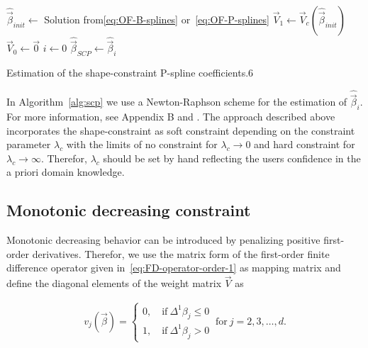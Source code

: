 \documentclass[10pt,a4paper]{report}
\begin{document}
\begin{algorithm}[H]
	\SetAlgoLined
	$\hat{\vec{\beta}}_{init} \gets$ Solution from\ref{eq:OF-B-splines} or~\ref{eq:OF-P-splines}\;
	$\vec{V}_1 \gets \vec{V}_c(\hat{\vec{\beta}}_{init})$\;
	$\vec{V}_0 \gets \vec{0}$\;
	$ i \gets 0$\;
	$\hat{\vec{\beta}}_{SCP} \gets \hat{\vec{\beta}}_{i}$
	\caption{Estimation of the shape-constraint P-spline coefficients.6}
	\label{alg:scp}
\end{algorithm}
%
In Algorithm~\ref{alg:scp}  we use a Newton-Raphson scheme for the estimation of $\hat{\vec{\beta}}_i$. For more information, see Appendix B and \cite{bollaerts2006simple}. The approach described above incorporates the shape-constraint as soft constraint depending on the constraint parameter $\lambda_c$ with the limits of no constraint for $\lambda_c \rightarrow 0$ and hard constraint for $\lambda_c \rightarrow \infty$. Therefor, $\lambda_c$ should be set by hand reflecting the users confidence in  the a priori domain knowledge. 

\subsection{Monotonic decreasing constraint} \label{subsec:MDC}

Monotonic decreasing behavior can be introduced by penalizing positive first-order derivatives. Therefor, we use the matrix form of the first-order finite difference operator given in~\ref{eq:FD-operator-order-1} as mapping matrix and define the diagonal elements of the weight matrix $\vec{V}$ as

\begin{align} \label{eq:weighting-matrix-dec-diagonal}
	v_j(\vec{\beta}) = \begin{cases}
		0, \quad \text{if} \ \Delta^1\beta_j \le 0 \\ 
		1, \quad \text{if} \ \Delta^1\beta_j > 0
	\end{cases}	\ \text{for} \ j=2,3, \dots, d.
\end{align}


\end{document}
